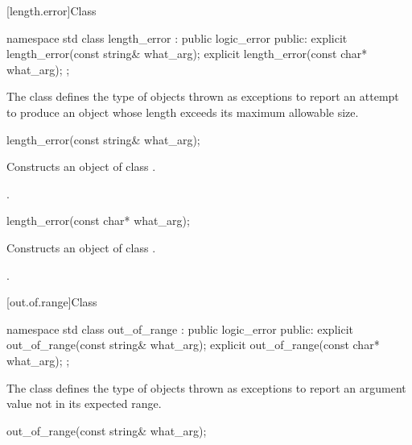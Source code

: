 [length.error]{Class }

%
\begin{codeblock}
namespace std {
  class length_error : public logic_error {
  public:
    explicit length_error(const string& what_arg);
    explicit length_error(const char* what_arg);
  };
}
\end{codeblock}

\pnum
The class
defines the type of objects thrown as exceptions
to report an attempt to produce
an object whose length exceeds its maximum allowable size.

%
\begin{itemdecl}
length_error(const string& what_arg);
\end{itemdecl}

\begin{itemdescr}
\pnum
\effects
Constructs an object of class
.

\pnum
\postcondition
{}.
\end{itemdescr}

%
\begin{itemdecl}
length_error(const char* what_arg);
\end{itemdecl}

\begin{itemdescr}
\pnum
\effects
Constructs an object of class
.

\pnum
\postcondition
{}.
\end{itemdescr}

[out.of.range]{Class }

%
\begin{codeblock}
namespace std {
  class out_of_range : public logic_error {
  public:
    explicit out_of_range(const string& what_arg);
    explicit out_of_range(const char* what_arg);
  };
}
\end{codeblock}

\pnum
The class
defines the type of objects thrown as exceptions to report an
argument value not in its expected range.

%
\begin{itemdecl}
out_of_range(const string& what_arg);
\end{itemdecl}

